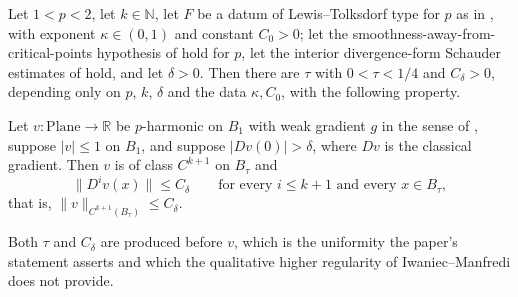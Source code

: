 \begin{lemma}
Let $1<p<2$, let $k\in\mathbb{N}$, let $F$ be a datum of Lewis--Tolksdorf type for $p$ as in
, with exponent $\kappa\in(0,1)$ and constant $C_0>0$; let the
smoothness-away-from-critical-points hypothesis of  hold
for $p$, let the interior divergence-form Schauder estimates of
 hold, and let $\delta>0$.  Then there are $\tau$ with
$0<\tau<1/4$ and $C_\delta>0$, depending only on $p$, $k$, $\delta$ and the data
$\kappa,C_0$, with the following property.

Let $v\colon\mathrm{Plane}\to\mathbb{R}$ be $p$-harmonic on $B_1$ with weak gradient $g$ in the
sense of , suppose $\lvert v\rvert\le1$ on $B_1$, and suppose
$\lvert Dv(0)\rvert>\delta$, where $Dv$ is the classical gradient.  Then $v$ is of class
$C^{k+1}$ on $B_\tau$ and
\[
  \bigl\lVert D^{i}v(x)\bigr\rVert\le C_\delta
  \qquad\text{for every }i\le k+1\text{ and every }x\in B_\tau,
\]
that is, $\lVert v\rVert_{C^{k+1}(B_\tau)}\le C_\delta$.

Both $\tau$ and $C_\delta$ are produced before $v$, which is the uniformity the paper's
statement asserts and which the qualitative higher regularity of Iwaniec--Manfredi does not
provide.
\end{lemma}
